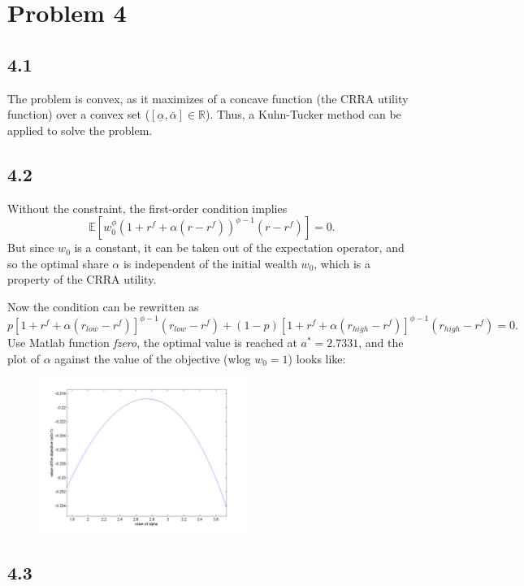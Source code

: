 \documentclass[11pt]{article}
\newcommand{\alp}{\ensuremath{\alpha}}
\begin{document}
\section*{Problem 4}

\subsection*{4.1}

The problem is convex, as it maximizes of a concave function (the CRRA utility function) over a convex set ($[\underline{\alp},\bar{\alp}] \in \mathbb{R}$). Thus, a Kuhn-Tucker method can be applied to solve the problem.

\subsection*{4.2}

Without the constraint, the first-order condition implies $$\mathbb{E} [w_0^\phi (1+ r^f + \alp(r-r^f))^{\phi-1} (r-r^f)] = 0.$$ But since $w_0$ is a constant, it can be taken out of the expectation operator, and so the optimal share $\alp$ is independent of the initial wealth $w_0$, which is a property of the CRRA utility.

Now the condition can be rewritten as $$ p [1+ r^f + \alp(r_{low}-r^f)]^{\phi-1} (r_{low}-r^f) + (1-p) [1+ r^f + \alp(r_{high}-r^f)]^{\phi-1} (r_{high}-r^f) = 0. $$ Use Matlab function \emph{fzero}, the optimal value is reached at $a^* = 2.7331 $, and the plot of $\alp$ against the value of the objective (wlog $w_0 = 1$) looks like:
\begin{figure}[h!]
\centering
\includegraphics[width=0.6\textwidth]{plot42}
\end{figure}

\subsection*{4.3}
\end{document}
